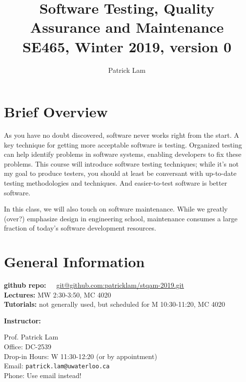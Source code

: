 \documentclass{article}
\begin{document}
\title{Software Testing, Quality Assurance and Maintenance\\SE465, Winter 2019, version 0}
\author{Patrick Lam}
\renewcommand{\today}{}
\maketitle
\vspace*{-2em}

\section*{Brief Overview}
As you have no doubt discovered, software never works right from the
start. A key technique for getting more acceptable software is
testing. Organized testing can help identify problems in software
systems, enabling developers to fix these problems.  This course will
introduce software testing techniques; while it's not my goal
to produce testers, you should at least be conversant
with up-to-date testing methodologies and techniques. And easier-to-test
software is better software.

In this class, we will also touch on software maintenance. While we
greatly (over?) emphasize design in engineering school, maintenance
consumes a large fraction of today's software development resources.

\section*{General Information}

\noindent
\begin{tabbing}
  {\bf github repo:}~~~\= \url{git@github.com:patricklam/stqam-2019.git}\\
  {\bf Lectures:} \> MW 2:30-3:50, MC 4020\\
{\bf Tutorials:} \> not generally used, but scheduled for M 10:30-11:20, MC 4020
\end{tabbing}

\noindent
{\bf Instructor:} \\

\noindent
\hspace*{2em} \begin{minipage}{.6\textwidth}
Prof. Patrick Lam\\
Office: DC-2539\\
Drop-in Hours: W 11:30-12:20 (or by appointment)\\
Email: {\tt patrick.lam@uwaterloo.ca}\\
Phone: Use email instead!

\end{minipage} \\[1em]
\end{document}
